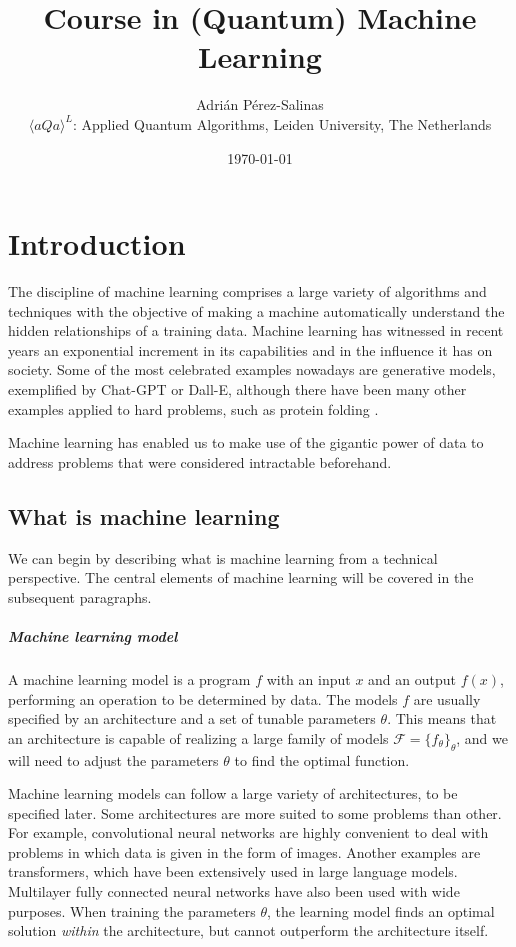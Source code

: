 \documentclass[]{report}
\title{{\Huge \textbf{Course in (Quantum) Machine Learning} \\ 
}}
\author{{\huge Adrián Pérez-Salinas} \\ \newline
$
\langle aQa \rangle^L$: Applied Quantum Algorithms, Leiden University, The Netherlands}
\date{\large\today}
\begin{document}
\maketitle
\tableofcontents

\chapter{Introduction}\label{ch.introduction}

The discipline of machine learning comprises a large variety of algorithms and techniques with the objective of making a machine automatically understand the hidden relationships of a training data. Machine learning has witnessed in recent years an exponential increment in its capabilities and in the influence it has on society. Some of the most celebrated examples nowadays are generative models, exemplified by Chat-GPT or Dall-E, although there have been many other examples applied to hard problems, such as protein folding \cite{jumper2021highly}. 

Machine learning has enabled us to make use of the gigantic power of data to address problems that were considered intractable beforehand. 

\section{What is machine learning}\label{sec.what-is}

We can begin by describing what is machine learning from a technical perspective. The central elements of machine learning will be covered in the subsequent paragraphs. 

\paragraph{Machine learning model}

    A machine learning model is a program $f$ with an input $x$ and an output $f(x)$, performing an operation to be determined by data. The models $f$ are usually specified by an architecture and a set of tunable parameters $\theta$. This means that an architecture is capable of realizing a large family of models $\mathcal F = \{ f_\theta\}_\theta$, and we will need to adjust the parameters $\theta$ to find the optimal function. 

    Machine learning models can follow a large variety of architectures, to be specified later. Some architectures are more suited to some problems than other. For example, convolutional neural networks are highly convenient to deal with problems in which data is given in the form of images. Another examples are transformers, which have been extensively used in large language models. Multilayer fully connected neural networks have also been used with wide purposes. When training the parameters $\theta$, the learning model finds an optimal solution \textit{within} the architecture, but cannot outperform the architecture itself. 
\end{document}
